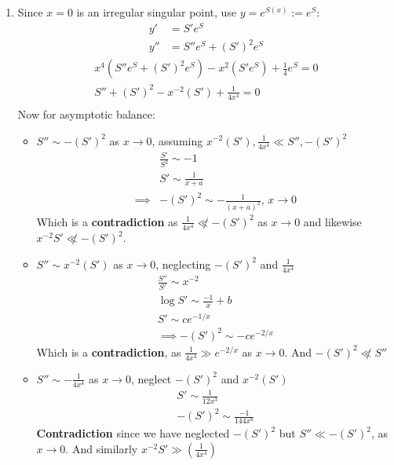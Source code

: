 \documentclass{/home/janmebows/Documents/LatexTemplates/myassignment}
\begin{document}
\begin{enumerate}
\begin{enumerate}
        \item Since $x=0$ is an irregular singular point, use  $y = e^{S(x)} := e^{S}$:
        \begin{align*}
            y' &= S' e^{S} \\
            y'' &= S'' e^{S} + (S')^2 e^{S}
        \end{align*}
        \begin{align*}
            x^4 (S'' e^{S} + (S')^2 e^{S}) - x^2 (S' e^{S}) + \frac14 e^{S} = 0\\
            S'' + (S')^2 - x^{-2} (S') + \frac1{4x^4} = 0\\
        \end{align*}
        Now for asymptotic balance:
        \begin{itemize}
            \item $S'' \sim -(S')^2$ as $x\to 0$, assuming $x^{-2}(S') , \frac1{4x^4} \ll S'', -(S')^2$
            \begin{align*}
                &\frac{S'}{S^2} \sim -1\\
                &S' \sim \frac{1}{x+a}\\
                \implies &-(S')^2 \sim -\frac{1}{(x+a)^2},\, x\to 0
            \end{align*}
            Which is a \textbf{contradiction} as $\frac{1}{4x^{4}} \not\ll -(S')^2$ as $x\to 0$ and likewise $x^{-2} S' \not \ll -(S')^2$.
            
            
            \item $S'' \sim x^{-2} (S')$ as $x\to 0$, neglecting $-(S')^2$ and $\frac{1}{4x^4}$
            \begin{align*}
                \frac{S''}{S'} \sim x^{-2}\\
                \log S' \sim \frac{-1}{x} + b\\
                S' \sim c e^{-1/x}\\
                \implies -(S')^2 \sim -c e^{-2/x}
            \end{align*}
            Which is a \textbf{contradiction}, as $\frac1{4x^4} \gg e^{-2/x}$ as $x\to0$. And $-(S')^2 \not \ll S''$
            
            \item $S'' \sim -\frac{1}{4x^4}$ as $x\to 0$, neglect $-(S')^2$ and $x^{-2}(S')$
            \begin{align*}
                S' \sim \frac{1}{12x^3}\\
                -(S')^2 \sim \frac{-1}{144 x^{6}}
            \end{align*}
            \textbf{Contradiction} since we have neglected $-(S')^2$ but $S'' \ll -(S')^2 $, as $x\to 0$. And similarly $x^{-2} S' \gg (\frac1{4x^4})$
            

\end{itemize}
\end{enumerate}
\end{enumerate}
\end{document}
